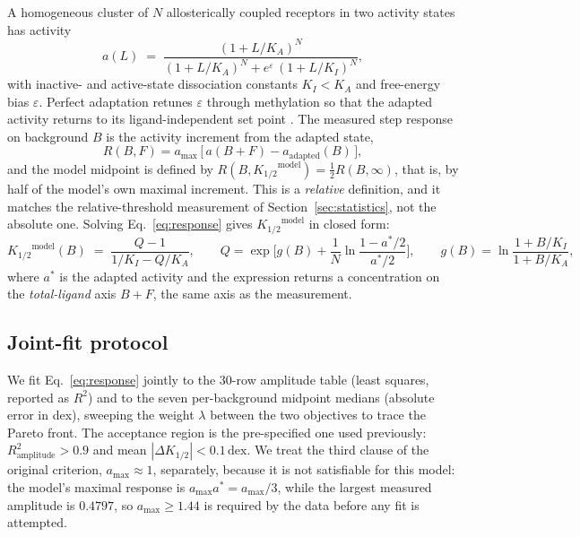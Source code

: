 ﻿\documentclass[11pt,a4paper]{article}
\newcommand{\dex}{\ensuremath{\,\mathrm{dex}}}
\newcommand{\Khalf}{\ensuremath{K_{1/2}}}
\begin{document}
A homogeneous cluster of $N$ allosterically coupled receptors in two activity states has activity
\begin{equation}
a(L) \;=\; \frac{(1+L/K_A)^{N}}{(1+L/K_A)^{N} + e^{\varepsilon}\,(1+L/K_I)^{N}},
\label{eq:mwc}
\end{equation}
with inactive- and active-state dissociation constants $K_I<K_A$ and free-energy bias
$\varepsilon$. Perfect adaptation retunes $\varepsilon$ through methylation so that the adapted
activity returns to its ligand-independent set point \cite{BarkaiLeibler1997}. The measured step
response on background $B$ is the activity increment from the adapted state,
\begin{equation}
R(B,F) = a_{\max}\,\big[\,a(B+F) - a_{\mathrm{adapted}}(B)\,\big],
\label{eq:response}
\end{equation}
and the model midpoint is defined by $R(B,\Khalf^{\mathrm{model}})=\tfrac12 R(B,\infty)$, that is,
by half of the model's own maximal increment. This is a \emph{relative} definition, and it matches
the relative-threshold measurement of Section~\ref{sec:statistics}, not the absolute one. Solving
Eq.~\eqref{eq:response} gives $\Khalf^{\mathrm{model}}$ in closed form:
\begin{equation}
\Khalf^{\mathrm{model}}(B) \;=\; \frac{Q-1}{1/K_I - Q/K_A},
\qquad
Q=\exp\!\Big[g(B)+\frac{1}{N}\ln\!\frac{1-a^{*}/2}{a^{*}/2}\Big],
\qquad
g(B)=\ln\frac{1+B/K_I}{1+B/K_A},
\label{eq:closed}
\end{equation}
where $a^{*}$ is the adapted activity and the expression returns a concentration on the
\emph{total-ligand} axis $B+F$, the same axis as the measurement.

\subsection{Joint-fit protocol}

We fit Eq.~\eqref{eq:response} jointly to the 30-row amplitude table (least squares, reported as
$R^2$) and to the seven per-background midpoint medians (absolute error in dex), sweeping the weight
$\lambda$ between the two objectives to trace the Pareto front. The acceptance region is the
pre-specified one used previously: $R^2_{\mathrm{amplitude}}>0.9$ and mean
$|\Delta\Khalf|<0.1\dex$. We treat the third clause of the original criterion, $a_{\max}\approx1$,
separately, because it is not satisfiable for this model: the model's maximal response is
$a_{\max}a^{*}=a_{\max}/3$, while the largest measured amplitude is $0.4797$, so $a_{\max}\ge1.44$
is required by the data before any fit is attempted.
\end{document}

